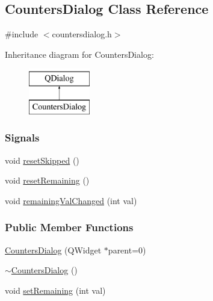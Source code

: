 \hypertarget{classCountersDialog}{}\subsection{Counters\+Dialog Class Reference}
\label{classCountersDialog}


{\ttfamily \#include $<$countersdialog.\+h$>$}

Inheritance diagram for Counters\+Dialog\+:\begin{figure}[H]
\begin{center}
\leavevmode
\includegraphics[height=2.000000cm]{classCountersDialog}
\end{center}
\end{figure}
\subsubsection*{Signals}
\begin{DoxyCompactItemize}
\item 
void \hyperlink{classCountersDialog_a721b63086592a577a17fada2c35fa8fa}{reset\+Skipped} ()
\item 
void \hyperlink{classCountersDialog_ad1642b578abe20a5a2bcb0ab8ecbd1cb}{reset\+Remaining} ()
\item 
void \hyperlink{classCountersDialog_a95672788db9b68ef07b0c251d6c1f0c8}{remaining\+Val\+Changed} (int val)
\end{DoxyCompactItemize}
\subsubsection*{Public Member Functions}
\begin{DoxyCompactItemize}
\item 
\hyperlink{classCountersDialog_a92f8263f1080effc36182051fdd06b72}{Counters\+Dialog} (Q\+Widget $\ast$parent=0)
\item 
\hyperlink{classCountersDialog_ab32b098f7b560b2fa550f51e0bba5863}{$\sim$\+Counters\+Dialog} ()
\item 
void \hyperlink{classCountersDialog_a40b2c28d1a33c2818ec9dea7063d0319}{set\+Remaining} (int val)
\end{DoxyCompactItemize}
